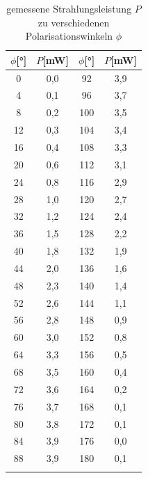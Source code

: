\begin{table}
\centering
\caption{gemessene Strahlungsleistung $P$ zu verschiedenen Polarisationswinkeln $\phi$}
\begin{tabular}{c c c c}
\toprule
{$\phi$[°]} & {$P$[mW]} & {$\phi$[°]} & {$P$[mW]}\\
\midrule
0	&	0,0	&	92	&	3,9	\\
4	&	0,1	&	96	&	3,7	\\
8	&	0,2	&	100	&	3,5	\\
12	&	0,3	&	104	&	3,4	\\
16	&	0,4	&	108	&	3,3	\\
20	&	0,6	&	112	&	3,1	\\
24	&	0,8	&	116	&	2,9	\\
28	&	1,0	&	120	&	2,7	\\
32	&	1,2	&	124	&	2,4	\\
36	&	1,5	&	128	&	2,2	\\
40	&	1,8	&	132	&	1,9	\\
44	&	2,0	&	136	&	1,6	\\
48	&	2,3	&	140	&	1,4	\\
52	&	2,6	&	144	&	1,1	\\
56	&	2,8	&	148	&	0,9	\\
60	&	3,0	&	152	&	0,8	\\
64	&	3,3	&	156	&	0,5	\\
68	&	3,5	&	160	&	0,4	\\
72	&	3,6	&	164	&	0,2	\\
76	&	3,7	&	168	&	0,1	\\
80	&	3,8	&	172	&	0,1	\\
84	&	3,9	&	176	&	0,0	\\
88	&	3,9	&	180	&	0,1	\\
\bottomrule
\label{tab:Polarisation}
\end{tabular}
\end{table}




